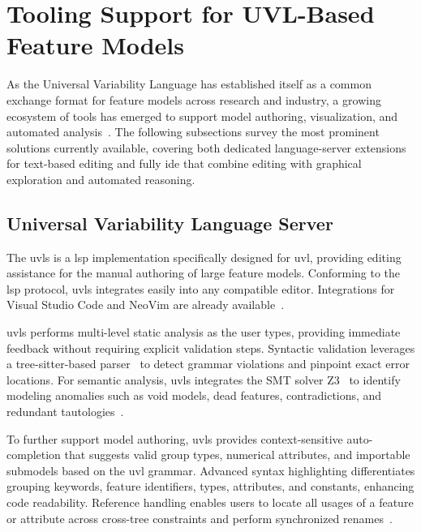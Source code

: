 \section{Tooling Support for UVL-Based Feature Models}
\label{sec:sota_uvl_tools}

As the Universal Variability Language has established itself as a common exchange format for feature models across research and industry, a growing ecosystem of tools has emerged to support model authoring, visualization, and automated analysis~\cite{benavides_uvl_2025}.
The following subsections survey the most prominent solutions currently available, covering both dedicated language-server extensions for text-based editing and fully \gls{ide} that combine editing with graphical exploration and automated reasoning.

\subsection{Universal Variability Language Server}
\label{subsec:uvls}
 
The \gls{uvls} is a \gls{lsp} implementation specifically designed for \gls{uvl}, providing editing assistance for the manual authoring of large feature models.
Conforming to the \gls{lsp} protocol, \gls{uvls} integrates easily into any compatible editor.
Integrations for Visual Studio Code and NeoVim are already available~\cite{loth_uvls_2023, noauthor_universal-variability-languageuvl-lsp_2025}.

\gls{uvls} performs multi-level static analysis as the user types, providing immediate feedback without requiring explicit validation steps.
Syntactic validation leverages a tree-sitter-based parser~\cite{loth_uvls_2023} to detect grammar violations and pinpoint exact error locations.
For semantic analysis, \gls{uvls} integrates the SMT solver Z3~\cite{noauthor_z3proverz3_2026} to identify modeling anomalies such as void models, dead features, contradictions, and redundant tautologies~\cite{loth_uvls_2023}.
 
To further support model authoring, \gls{uvls} provides context-sensitive auto-completion that suggests valid group types, numerical attributes, and importable submodels based on the \gls{uvl} grammar.
Advanced syntax highlighting differentiates grouping keywords, feature identifiers, types, attributes, and constants, enhancing code readability.
Reference handling enables users to locate all usages of a feature or attribute across cross-tree constraints and perform synchronized renames~\cite{loth_uvls_2023}.
 
